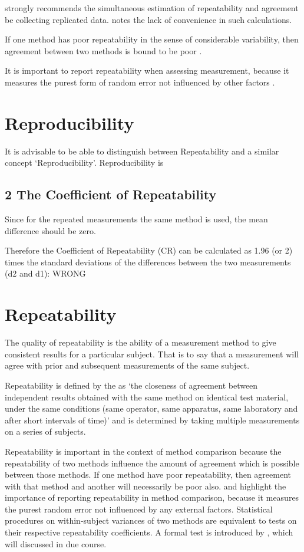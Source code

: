 \documentclass[Chap2cmain.tex]{subfiles}
\begin{document}
	
	
	\citet{BA99} strongly recommends the simultaneous estimation of
	repeatability and agreement be collecting replicated data.
	\citet{ARoy2009} notes the lack of convenience in such
	calculations.
	
	
	If one method has poor repeatability in the sense of considerable
	variability, then agreement between two methods is bound to be
	poor \citep{ARoy2009}.
	
	It is important to report repeatability when assessing
	measurement, because it measures the purest form of random error
	not influenced by other factors \citep{Barnhart}.
	
\section{Reproducibility}
 
It is advisable to be able to distinguish between Repeatability and a similar concept ‘Reproducibility’. Reproducibility is
 
\subsection{2 The Coefficient of Repeatability}
Since for the repeated measurements the same method is used, the mean difference should be zero.
 
Therefore the Coefficient of Repeatability (CR) can be calculated as 1.96 (or 2) times the standard deviations of the differences between the two measurements (d2 and d1):
WRONG

\newpage
\section{Repeatability}

The quality of repeatability is the ability of a measurement method to give consistent results for a particular subject. That is to say that a measurement will agree with prior and subsequent measurements of the same subject.

Repeatability is defined by the \citet{IUPAC} as `the closeness of agreement between independent results obtained with the same method on identical test material, under the same conditions (same
operator, same apparatus, same laboratory and after short intervals of time)'  and is determined by taking multiple measurements on a series of subjects.

Repeatability is important in the context of method comparison because the repeatability of two methods influence the amount of agreement which is possible between those methods. If one method have poor repeatability, then agreement with that method and another will necessarily be poor also.
\citet{barnhart} and \citet{roy} highlight the importance of reporting repeatability in method comparison, because it measures the purest random error not influenced by any external factors. Statistical procedures on within-subject variances of two methods are equivalent to tests on their respective repeatability coefficients. A formal test is introduced by \citet{roy}, which will discussed in due course.
\end{document}
